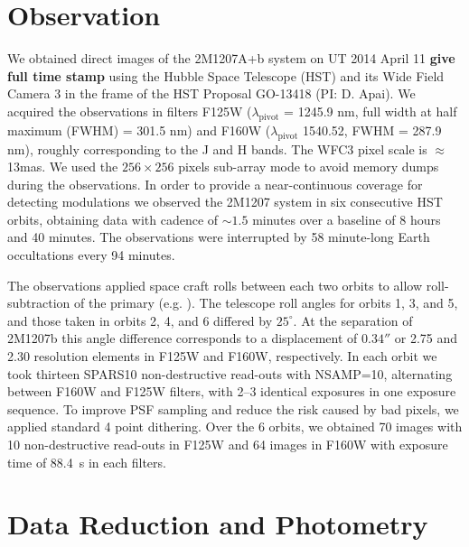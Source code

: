 \documentclass[apj]{emulateapj}
\newcommand{\ima}{\texttt{ima} files }
\newcommand{\flt}{\texttt{flt} files }
\begin{document}
\section{Observation} We obtained direct images of the 2M1207A+b
system on UT 2014 April 11 {\bf give full time stamp} using the Hubble
Space Telescope (HST) and its Wide Field Camera 3 \citep[WFC3,
][]{McKenty2010} in the frame of the HST Proposal GO-13418 (PI:
D. Apai). We acquired the observations in filters F125W
($\lambda_{\mbox{pivot}}$ = 1245.9 nm, full width at half maximum
(FWHM) = 301.5 nm) and F160W ($\lambda_{\mbox{pivot}}$ 1540.52, FWHM =
287.9 nm), roughly corresponding to the J and H bands. The WFC3 pixel
scale is $\approx$13mas. We used the $256\times256$ pixels sub-array
mode to avoid memory dumps during the observations.  In order to
provide a near-continuous coverage for detecting modulations we
observed the 2M1207 system in six consecutive HST orbits, obtaining
data with cadence of $\sim1.5$ minutes over a baseline of 8 hours and
40 minutes. The observations were interrupted by 58 minute-long Earth
occultations every 94 minutes.

The observations applied space craft rolls between each two orbits to
allow roll-subtraction of the primary (e.g. \citealt{Song2006}). The
telescope roll angles for orbits 1, 3, and 5, and those taken in
orbits 2, 4, and 6 differed by $25^{\circ}$. At the separation of
2M1207b this angle difference corresponds to a displacement of
$0.34''$ or 2.75 and 2.30 resolution elements in F125W and F160W,
respectively. In each orbit we took thirteen SPARS10 non-destructive
read-outs with NSAMP=10, alternating between F160W and F125W filters,
with 2--3 identical exposures in one exposure sequence. To improve PSF
sampling and reduce the risk caused by bad pixels, we applied standard
4 point dithering. Over the 6 orbits, we obtained 70 images with 10
non-destructive read-outs in F125W and 64 images in F160W with
exposure time of 88.4~s in each filters.

\section{Data Reduction and Photometry}

\end{document}

